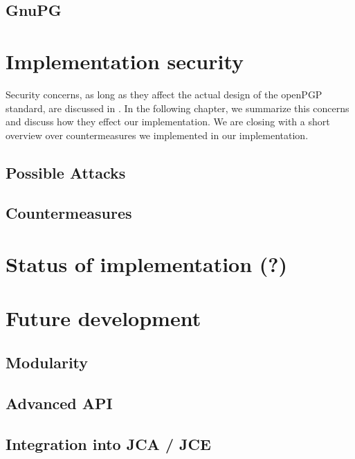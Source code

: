 \subsection{GnuPG}


\section{Implementation security}

Security concerns, as long as they affect the actual design of the openPGP standard, are discussed in \citep{RFC4880}. In the following chapter, we summarize this concerns and discuss how they effect our implementation. We are closing with a 	short overview over countermeasures we implemented in our implementation.

\subsection{Possible Attacks}


\subsection{Countermeasures}


\section{Status of implementation (?)}


\section{Future development}

\subsection{Modularity}

\subsection{Advanced API}

\subsection{Integration into JCA / JCE}